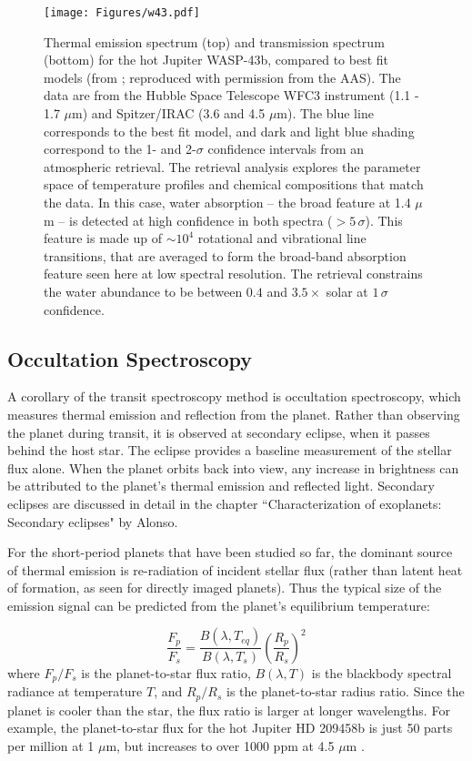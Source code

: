 \documentclass[graybox,natbib,nosecnum]{svmult}
\begin{document}
\begin{figure}
\begin{centering}
\texttt{[image: Figures/w43.pdf]}
\caption{Thermal emission spectrum (top) and transmission spectrum (bottom) for the hot Jupiter WASP-43b, compared to best fit models (from \citealt{kreidberg15b}; reproduced with permission from the AAS). The data are from the Hubble Space Telescope WFC3 instrument (1.1 - 1.7 $\mu$m) and Spitzer/IRAC (3.6 and 4.5 $\mu$m). The blue line corresponds to the best fit model, and dark and light blue shading correspond to the 1- and 2-$\sigma$ confidence intervals from an atmospheric retrieval. The retrieval analysis explores the parameter space of temperature profiles and chemical compositions that match the data. In this case, water absorption -- the broad feature at 1.4 $\mu$m -- is detected at high confidence in both spectra ($>5\,\sigma$). This feature is made up of $\sim10^4$ rotational and vibrational line transitions, that are averaged to form the broad-band absorption feature seen here at low spectral resolution. The retrieval constrains the water abundance to be between $0.4$ and $3.5\times$ solar at $1\,\sigma$ confidence.} 
\label{fig:spectra}       
\end{centering}
\end{figure}


\subsection{Occultation Spectroscopy}
A corollary of the transit spectroscopy method is occultation spectroscopy, which measures thermal emission and reflection from the planet. Rather than observing the planet during transit, it is observed at secondary eclipse, when it passes behind the host star. The eclipse provides a baseline measurement of the stellar flux alone. When the planet orbits back into view, any increase in brightness can be attributed to the planet's thermal emission and reflected light. Secondary eclipses are discussed in detail in the chapter ``Characterization of exoplanets: Secondary eclipses" by Alonso.

For the short-period planets that have been studied so far, the dominant source of thermal emission is re-radiation of incident stellar flux (rather than latent heat of formation, as seen for directly imaged planets). Thus the typical size of the emission signal can be predicted from the planet's equilibrium temperature:

\begin{equation}
\label{eqn:fpfs}
\frac{F_p}{F_s} = \frac{B(\lambda, T_{eq})}{B(\lambda, T_s)}\left(\frac{R_p}{R_s}\right)^2
\end{equation}
where $F_p/F_s$ is the planet-to-star flux ratio, $B(\lambda, T)$ is the blackbody spectral radiance at temperature $T$, and $R_p/R_s$ is the planet-to-star radius ratio. Since the planet is cooler than the star, the flux ratio is larger at longer wavelengths. For example, the planet-to-star flux for the hot Jupiter HD 209458b is just 50 parts per million at 1 $\mu$m, but increases to over 1000 ppm at 4.5 $\mu$m \citep{line16}.
\end{document}

